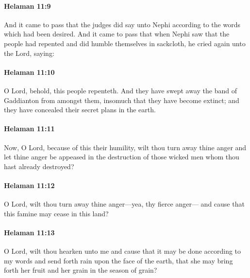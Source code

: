 		\paragraph{Helaman 11:9} %
			\label{HELAMAN-11-9}

			And it came to pass that the judges did say unto Nephi
			according to the words which had been desired.
			And it came to pass that when Nephi saw
			that the people had repented and did humble themselves in sackcloth,
			he cried again unto the Lord, saying:

		\paragraph{Helaman 11:10} %
			\label{HELAMAN-11-10}

			O Lord, behold, this people repenteth.
			And they have swept away the band of Gaddianton from amongst them,
			insomuch that they have become extinct;
			and they have concealed their secret plans in the earth.

		\paragraph{Helaman 11:11} %
			\label{HELAMAN-11-11}

			Now, O Lord, because of this their humility,
			wilt thou turn away thine anger
			and let thine anger be appeased in the destruction of those wicked men
			whom thou hast already destroyed?

		\paragraph{Helaman 11:12} %
			\label{HELAMAN-11-12}

			O Lord, wilt thou turn away thine anger---yea, thy fierce anger---
			and cause that this famine may cease in this land?

		\paragraph{Helaman 11:13} %
			\label{HELAMAN-11-13}

			O Lord, wilt thou hearken unto me
			and cause that it may be done according to my words
			and send forth rain upon the face of the earth,
			that she may bring forth her fruit and her grain in the season of grain?

